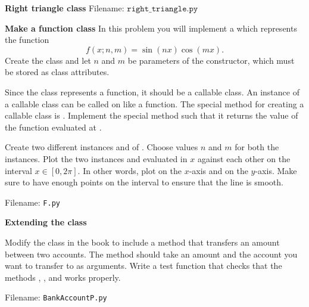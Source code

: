 \begin{Problem}{\textbf{Right triangle class}}
Filename: $\texttt{right\_triangle.py}$
\end{Problem}


\begin{Problem}{\textbf{Make a function class}}
In this problem you will implement a  which represents the function
\begin{equation*}
    f(x; n, m) =  \sin(n x) \cos(m x).
\end{equation*}
Create the class and let $n$ and $m$ be parameters of the constructor, which must
be stored as class attributes.

Since the class represents a function, it should be a callable class. An instance
of a callable class can be called on like a function. The special method for
creating a callable class is . Implement the
special method  such that it returns the value
of the function evaluated at .

Create two different instances  and  of . Choose values $n$ and $m$ for both the instances. Plot the two instances  and  evaluated in $x$ against each other on the interval $x \in [0, 2 \pi]$. In other words, plot  on the $x$-axis and  on the $y$-axis. Make sure to have enough points on the interval to ensure that the line is smooth.


Filename: \texttt{F.py}
\end{Problem}

\begin{Problem}{\textbf{Extending the  class}} \label{prob75}

\noindent Modify the class  in the book to include a method  that transfers an amount between two accounts. The method should take an amount and the account you want to transfer to as arguments. Write a test function that checks that the methods , ,  and  works properly.

Filename: \texttt{BankAccountP.py}

\end{Problem}

